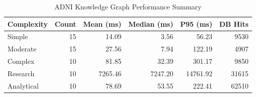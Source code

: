 \begin{table}[htbp]
\centering
\caption{ADNI Knowledge Graph Performance Summary}
\label{tab:performance_summary}
\begin{tabular}{|l|r|r|r|r|r|}
\hline
\textbf{Complexity} & \textbf{Count} & \textbf{Mean (ms)} & \textbf{Median (ms)} & \textbf{P95 (ms)} & \textbf{DB Hits} \\
\hline
Simple & 15 & 14.09 & 3.56 & 56.23 & 9530 \\
Moderate & 15 & 27.56 & 7.94 & 122.19 & 4907 \\
Complex & 10 & 81.85 & 32.39 & 301.17 & 9850 \\
Research & 10 & 7265.46 & 7247.20 & 14761.92 & 31615 \\
Analytical & 10 & 78.69 & 53.55 & 222.41 & 62510 \\
\hline
\end{tabular}
\end{table}
